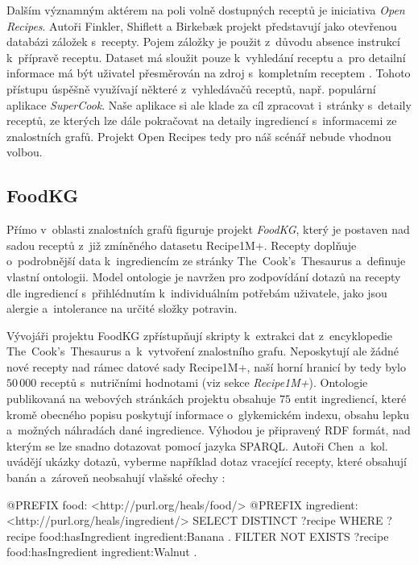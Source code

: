 Dalším významným aktérem na poli volně dostupných receptů je iniciativa \emph{Open Recipes}. Autoři Finkler, Shiflett a Birkebæk projekt představují jako otevřenou databázi záložek s~recepty. Pojem záložky je použit z~důvodu absence instrukcí k~přípravě receptu. Dataset má sloužit pouze k~vyhledání receptu a~pro detailní informace má být uživatel přesměrován na zdroj s~kompletním receptem \citep{open-recipes}. Tohoto přístupu úspěšně využívají některé z~vyhledávačů receptů, např. populární aplikace \emph{SuperCook}. Naše aplikace si ale klade za cíl zpracovat i~stránky s~detaily receptů, ze kterých lze dále pokračovat na detaily ingrediencí s~informacemi ze znalostních grafů. Projekt Open Recipes tedy pro náš scénář nebude vhodnou volbou.

\subsection{FoodKG}

Přímo v~oblasti znalostních grafů figuruje projekt \emph{FoodKG}, který je postaven nad sadou receptů z~již zmíněného datasetu Recipe1M+. Recepty doplňuje o~podrobnější data k~ingrediencím ze stránky The~Cook's~Thesaurus a~definuje vlastní ontologii. Model ontologie je navržen pro zodpovídání dotazů na recepty dle ingrediencí s~přihlédnutím k~individuálním potřebám uživatele, jako jsou alergie a~intolerance na určité složky potravin.

Vývojáři projektu FoodKG zpřístupňují skripty k~extrakci dat z~encyklopedie The~Cook's~Thesaurus a~k~vytvoření znalostního grafu. Neposkytují ale žádné nové recepty nad rámec datové sady Recipe1M+, naší horní hranicí by tedy bylo $50\,000$ receptů s~nutričními hodnotami (viz sekce \emph{Recipe1M+}). Ontologie publikovaná na webových stránkách projektu obsahuje $75$ entit ingrediencí, které kromě obecného popisu poskytují informace o~glykemickém indexu, obsahu lepku a~možných náhradách dané ingredience. Výhodou je připravený RDF formát, nad kterým se lze snadno dotazovat pomocí jazyka SPARQL. Autoři Chen~a~kol. uvádějí ukázky dotazů, vyberme například dotaz vracející recepty, které obsahují banán a~zároveň neobsahují vlašské ořechy \citep{food-kg}:

\begin{code}
@PREFIX food: <http://purl.org/heals/food/>
@PREFIX ingredient: <http://purl.org/heals/ingredient/>
SELECT DISTINCT ?recipe
WHERE {
    ?recipe food:hasIngredient ingredient:Banana .
    FILTER NOT EXISTS {
        ?recipe food:hasIngredient ingredient:Walnut .
    }
}
\end{code}


